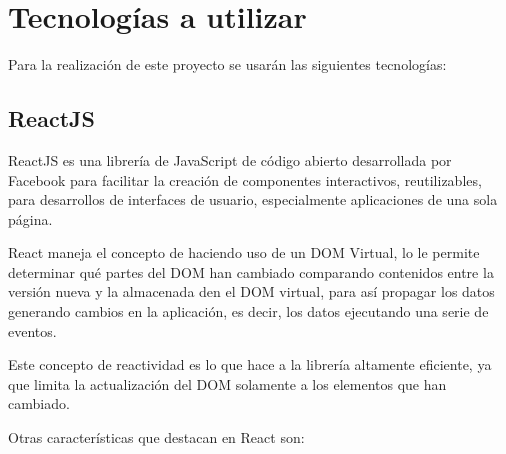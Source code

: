\section{Tecnologías a utilizar}

    Para la realización de este proyecto se usarán las siguientes tecnologías:

    \subsection{ReactJS}

        ReactJS es una librería de JavaScript de código abierto desarrollada por Facebook para facilitar la creación de componentes interactivos, reutilizables, para desarrollos de interfaces de usuario, especialmente aplicaciones de una sola página.

        React maneja el concepto de  haciendo uso de un DOM Virtual, lo le permite determinar qué partes del DOM han cambiado comparando contenidos entre la versión nueva y la almacenada den el DOM virtual, para así propagar los datos generando cambios en la aplicación, es decir, los datos  ejecutando una serie de eventos.

        Este concepto de reactividad es lo que hace a la librería altamente eficiente, ya que limita la actualización del DOM solamente a los elementos que han cambiado.

        Otras características que destacan en React son:

